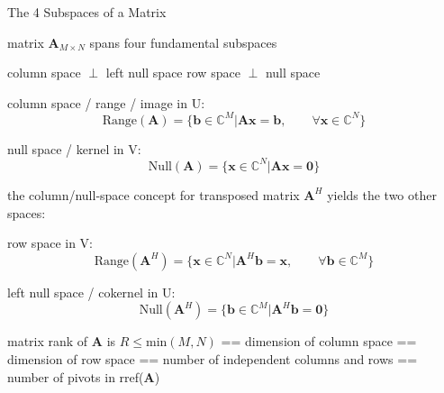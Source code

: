 \documentclass[mathserif, aspectratio=1610]{intbeamer}
\begin{document}





\begin{frame}{The 4 Subspaces of a Matrix}

matrix $\bm{A}_{M \times N}$ spans four fundamental subspaces

\hspace{4.25cm}
\textcolor{C0}{column space} $\perp$ \textcolor{C4}{left null space}
\hspace{0.75cm}
\textcolor{C2}{row space} $\perp$ \textcolor{C1}{null space}

\textcolor{C0}{column space / range / image in U:} $$\text{Range}(\bm{A}) = \{\bm{b}\in\mathbb{C}^M | \bm{A} \bm{x} = \bm{b},\qquad\forall \bm{x}\in\mathbb{C}^N\}$$

\textcolor{C1}{null space / kernel in V:} $$\text{Null}(\bm{A}) = \{\bm{x}\in\mathbb{C}^N | \bm{A} \bm{x} = \bm{0}\}$$

the column/null-space concept for transposed matrix $\bm{A}^H$ yields the two other spaces:

\textcolor{C2}{row space in V:} $$\text{Range}(\bm{A}^H) = \{\bm{x}\in\mathbb{C}^N | \bm{A}^H \bm{b} = \bm{x},\qquad\forall \bm{b}\in\mathbb{C}^M\}$$

\textcolor{C4}{left null space / cokernel in U:} $$\text{Null}(\bm{A}^H) = \{\bm{b}\in\mathbb{C}^M | \bm{A}^H \bm{b} = \bm{0}\}$$

matrix rank of $\bm{A}$ is $R\leq \text{min}(M,N)$ == dimension of column space == dimension of row space == number of independent columns and rows
== number of pivots in rref($\bm{A}$)

\end{frame}
\end{document}

